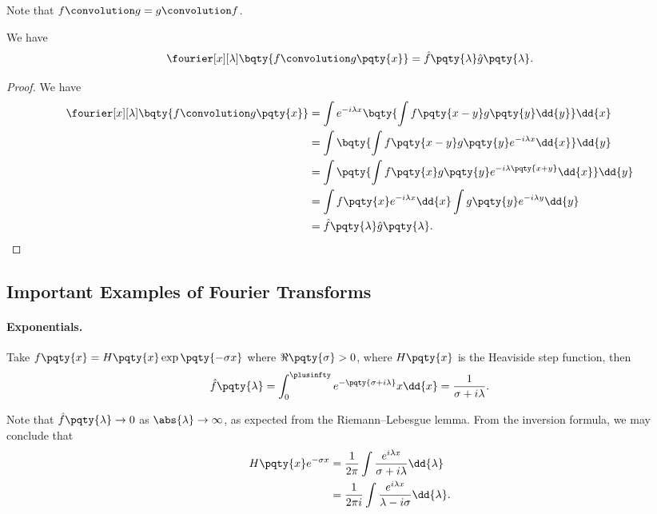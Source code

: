 Note that \(f \convolution g = g \convolution f\).

\begin{proposition}
    \label{prop:convolution-theorem}%
    We have
    \begin{equation}
        \fourier[x][\lambda] \bqty{f \convolution g\pqty{x}} = \hat{f}\pqty{\lambda} \hat{g}\pqty{\lambda}.
    \end{equation}
\end{proposition}

\begin{proof}
    We have
    \begin{subequations}
        \begin{align}
            \fourier[x][\lambda] \bqty{f \convolution g\pqty{x}} &= \int e^{- i \lambda x} \bqty{\int f\pqty{x - y} g\pqty{y} \dd{y}} \dd{x} \\
            &= \int \bqty{\int f\pqty{x - y} g\pqty{y} e^{- i \lambda x} \dd{x}} \dd{y} \\
            &= \int \pqty{\int f\pqty{x} g\pqty{y} e^{- i \lambda \pqty{x + y}} \dd{x}} \dd{y} \\
            &= \int f\pqty{x} e^{- i \lambda x} \dd{x} \int g\pqty{y} e^{- i \lambda y} \dd{y} \\
            &= \hat{f}\pqty{\lambda} \hat{g}\pqty{\lambda}.
        \end{align}
    \end{subequations}
\end{proof}

\subsection{Important Examples of Fourier Transforms}

\paragraph{Exponentials.} Take \(f\pqty{x} = H\pqty{x} \exp\pqty{- \sigma x}\) where \(\Re\pqty{\sigma} > 0\), where \(H\pqty{x}\) is the Heaviside step function, then
\begin{equation}
    \hat{f}\pqty{\lambda} = \int_{0}^{\plusinfty} e^{-\pqty{\sigma + i \lambda}} x \dd{x} = \frac{1}{\sigma + i \lambda}.
\end{equation}

Note that \(\hat{f}\pqty{\lambda} \to 0\) as \(\abs{\lambda} \to \infty\), as expected from the Riemann--Lebesgue lemma. From the inversion formula, we may conclude that
\begin{subequations}
    \begin{align}
        H\pqty{x} e^{-\sigma x} &= \frac{1}{2\pi} \int \frac{e^{i \lambda x}}{\sigma + i \lambda} \dd{\lambda} \\
        &= \frac{1}{2 \pi i} \int \frac{e^{i \lambda x}}{\lambda - i \sigma} \dd{\lambda}.
    \end{align}
\end{subequations}

